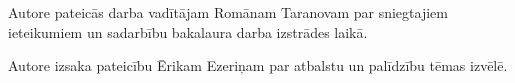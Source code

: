 ﻿Autore pateicās darba vadītājam Romānam Taranovam par sniegtajiem ieteikumiem un sadarbību bakalaura darba izstrādes laikā.

Autore izsaka pateicību Ērikam Ezeriņam par atbalstu un  palīdzību tēmas izvēlē.